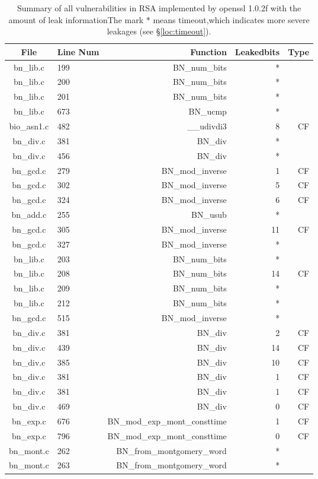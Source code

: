 \begin{table*}%
\centering
\caption{Summary of all vulnerabilities in RSA implemented by openssl 1.0.2f with the amount of leak informationThe mark $*$ means timeout,which indicates more severe leakages (see \S\ref{loc:timeout}).}\label{tab:RSAopenssl}
\begin{tabular}{clrrr}
\hline
\textbf{File} & \textbf{Line Num} & \textbf{Function} & \textbf{Leakedbits} & \textbf{Type} \\\hline
bn\_lib.c&199&BN\_num\_bits&*&\\
bn\_lib.c&200&BN\_num\_bits&*&\\
bn\_lib.c&201&BN\_num\_bits&*&\\
bn\_lib.c&673&BN\_ucmp&*&\\
bio\_asn1.c&482&\_\_udivdi3&8 &CF\\
bn\_div.c&381&BN\_div&*&\\
bn\_div.c&456&BN\_div&*&\\
bn\_gcd.c&279&BN\_mod\_inverse&1 &CF\\
bn\_gcd.c&302&BN\_mod\_inverse&5 &CF\\
bn\_gcd.c&324&BN\_mod\_inverse&6 &CF\\
bn\_add.c&255&BN\_usub&*&\\
bn\_gcd.c&305&BN\_mod\_inverse&11&CF\\
bn\_gcd.c&327&BN\_mod\_inverse&*&\\
bn\_lib.c&203&BN\_num\_bits&*&\\
bn\_lib.c&208&BN\_num\_bits&14&CF\\
bn\_lib.c&209&BN\_num\_bits&*&\\
bn\_lib.c&212&BN\_num\_bits&*&\\
bn\_gcd.c&515&BN\_mod\_inverse&*&\\
bn\_div.c&381&BN\_div&2 &CF\\
bn\_div.c&439&BN\_div&14&CF\\
bn\_div.c&385&BN\_div&10&CF\\
bn\_div.c&381&BN\_div&1 &CF\\
bn\_div.c&381&BN\_div&1 &CF\\
bn\_div.c&469&BN\_div&0 &CF\\
bn\_exp.c&676&BN\_mod\_exp\_mont\_consttime&1 &CF\\
bn\_exp.c&796&BN\_mod\_exp\_mont\_consttime&0 &CF\\
bn\_mont.c&262&BN\_from\_montgomery\_word&*&\\
bn\_mont.c&263&BN\_from\_montgomery\_word&*&\\

\end{tabular}
\end{table*}
